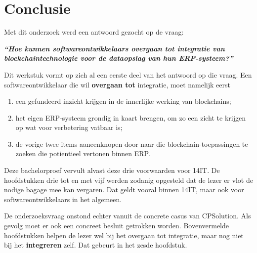 
\chapter{Conclusie}
\label{ch:conclusie}



Met dit onderzoek werd een antwoord gezocht op de vraag:

\begin{center}
	\textit{\textbf{``Hoe kunnen softwareontwikkelaars overgaan tot integratie van blockchaintechnologie voor de dataopslag van hun ERP-systeem?''}}
\end{center}

Dit werkstuk vormt op zich al een eerste deel van het antwoord op die vraag. Een softwareontwikkelaar die wil \textbf{overgaan tot} integratie, moet namelijk eerst
\begin{enumerate}
	\item een gefundeerd inzicht krijgen in de innerlijke werking van blockchains;
	\item het eigen ERP-systeem grondig in kaart brengen, om zo een zicht te krijgen op wat voor verbetering vatbaar is;
	\item de vorige twee items aaneenknopen door naar die blockchain-toepassingen te zoeken die potientieel vertonen binnen ERP.
\end{enumerate}

Deze bachelorproef vervult alvast deze drie voorwaarden voor 14IT. De hoofdstukken drie tot en met vijf werden zodanig opgesteld dat de lezer er vlot de nodige bagage mee kan vergaren. Dat geldt vooral binnen 14IT, maar ook voor softwareontwikkelaars in het algemeen.

De onderzoeksvraag onstond echter vanuit de concrete casus van CPSolution. Als gevolg moet er ook een concreet besluit getrokken worden. Bovenvermelde hoofdstukken helpen de lezer wel bij het overgaan tot integratie, maar nog niet bij het \textbf{integreren} zelf. Dat gebeurt in het zesde hoofdstuk.

